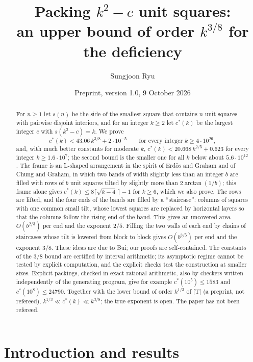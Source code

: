 \documentclass[11pt]{amsart}
\title[An upper bound of order $k^{3/8}$ for the deficiency]{Packing $k^2-c$ unit squares:\\ an upper bound of order $k^{3/8}$ for the deficiency}
\author{Sungjoon Ryu}
\date{Preprint, version 1.0, 9 October 2026}
\newcommand{\cs}{c^{*}}
\theoremstyle{definition}
\theoremstyle{remark}
\numberwithin{equation}{section}
\begin{document}
\begin{abstract}
For $n\ge1$ let $s(n)$ be the side of the smallest square that contains $n$ unit squares with pairwise disjoint
interiors, and for an integer $k\ge2$ let $\cs(k)$ be the largest integer $c$ with $s(k^2-c)=k$. We prove
\[
\cs(k)<43.06\,k^{3/8}+2\cdot10^{-5}\qquad\text{for every integer }k\ge4\cdot10^{26},
\]
and, with much better constants for moderate $k$,
$\cs(k)<20.668\,k^{2/5}+0.623$ for every integer $k\ge1.6\cdot10^7$; the second bound is the smaller one for all
$k$ below about $5.6\cdot10^{12}$. The frame is an L-shaped arrangement in the spirit of Erd\H{o}s and Graham and of
Chung and Graham, in which two bands of width slightly less than an integer $b$ are filled with rows of $b$ unit squares
tilted by slightly more than $2\arctan(1/b)$; this frame alone gives $\cs(k)\le8\lceil\sqrt{k-4}\,\rceil-1$ for $k\ge6$,
which we also prove. The rows are lifted, and the four ends of the bands are filled by a ``staircase'': columns of
squares with one common small tilt, whose lowest squares are replaced by horizontal layers so that the columns follow
the rising end of the band. This gives an uncovered area $O(b^{2/3})$ per end and the exponent $2/5$. Filling the two
walls of each end by chains of staircases whose tilt is lowered from block to block gives $O(b^{3/5})$ per end and the
exponent $3/8$. These ideas are due to Bui; our proofs are self-contained. The constants of the $3/8$ bound are
certified by interval arithmetic; its asymptotic regime cannot be tested by explicit computation, and the explicit
checks test the construction at smaller sizes. Explicit packings, checked in exact rational arithmetic, also by
checkers written independently of the generating program, give for example $\cs(10^5)\le1583$ and
$\cs(10^8)\le24790$. Together with the lower bound of order $k^{1/3}$ of [T] (a preprint, not refereed),
$k^{1/3}\ll\cs(k)\ll k^{3/8}$; the true exponent is open. The paper has not been refereed.
\end{abstract}
\maketitle

\section{Introduction and results}\label{sec:intro}
\end{document}
